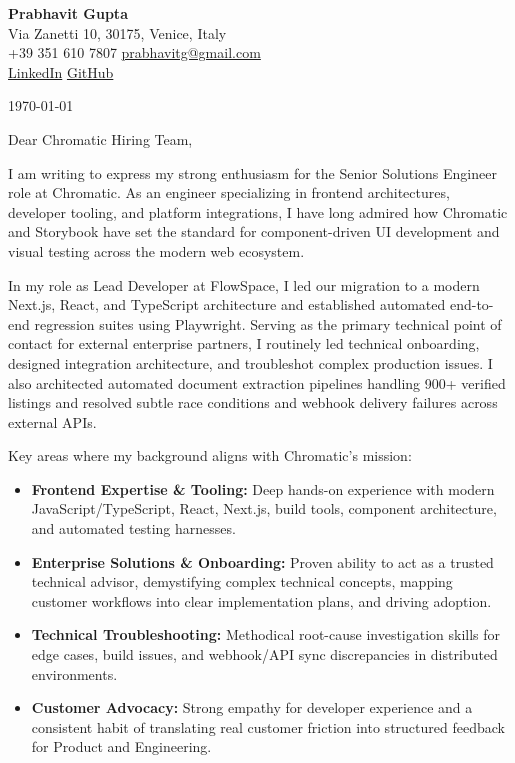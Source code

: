 \documentclass[11pt,a4paper]{article}
\begin{document}
\begin{center}
    {\huge \textbf{Prabhavit Gupta}} \\
    \vspace{4pt}
    Via Zanetti 10, 30175, Venice, Italy \\
    +39 351 610 7807 \textbar{} \href{mailto:prabhavitg@gmail.com}{prabhavitg@gmail.com} \\
    \href{https://www.linkedin.com/in/prabhavit/}{LinkedIn} \textbar{} \href{https://github.com/prab-gupta}{GitHub}
\end{center}

\vspace{14pt}

\noindent \today

\vspace{6pt}

\noindent Dear Chromatic Hiring Team,

\vspace{6pt}

\noindent I am writing to express my strong enthusiasm for the Senior Solutions Engineer role at Chromatic. As an engineer specializing in frontend architectures, developer tooling, and platform integrations, I have long admired how Chromatic and Storybook have set the standard for component-driven UI development and visual testing across the modern web ecosystem.

\noindent In my role as Lead Developer at FlowSpace, I led our migration to a modern Next.js, React, and TypeScript architecture and established automated end-to-end regression suites using Playwright. Serving as the primary technical point of contact for external enterprise partners, I routinely led technical onboarding, designed integration architecture, and troubleshot complex production issues. I also architected automated document extraction pipelines handling 900+ verified listings and resolved subtle race conditions and webhook delivery failures across external APIs.

\noindent Key areas where my background aligns with Chromatic's mission:

\begin{itemize}[leftmargin=*]
    \item \textbf{Frontend Expertise \& Tooling:} Deep hands-on experience with modern JavaScript/TypeScript, React, Next.js, build tools, component architecture, and automated testing harnesses.
    \item \textbf{Enterprise Solutions \& Onboarding:} Proven ability to act as a trusted technical advisor, demystifying complex technical concepts, mapping customer workflows into clear implementation plans, and driving adoption.
    \item \textbf{Technical Troubleshooting:} Methodical root-cause investigation skills for edge cases, build issues, and webhook/API sync discrepancies in distributed environments.
    \item \textbf{Customer Advocacy:} Strong empathy for developer experience and a consistent habit of translating real customer friction into structured feedback for Product and Engineering.
\end{itemize}
\end{document}
